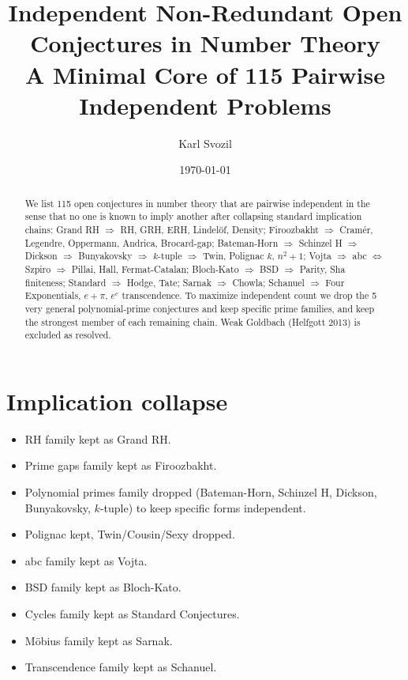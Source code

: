\documentclass[aps,prd,amsmath,amssymb,twocolumn,superscriptaddress]{revtex4-2}
\begin{document}
\title{Independent Non-Redundant Open Conjectures in Number Theory\\
A Minimal Core of 115 Pairwise Independent Problems}
\author{Karl Svozil}
\date{\today}

\begin{abstract}
We list 115 open conjectures in number theory that are pairwise independent in the sense that no one is known to imply another after collapsing standard implication chains: Grand RH $\Rightarrow$ RH, GRH, ERH, Lindel\"of, Density; Firoozbakht $\Rightarrow$ Cram\'er, Legendre, Oppermann, Andrica, Brocard-gap; Bateman-Horn $\Rightarrow$ Schinzel H $\Rightarrow$ Dickson $\Rightarrow$ Bunyakovsky $\Rightarrow$ $k$-tuple $\Rightarrow$ Twin, Polignac $k$, $n^2+1$; Vojta $\Rightarrow$ abc $\Leftrightarrow$ Szpiro $\Rightarrow$ Pillai, Hall, Fermat-Catalan; Bloch-Kato $\Rightarrow$ BSD $\Rightarrow$ Parity, Sha finiteness; Standard $\Rightarrow$ Hodge, Tate; Sarnak $\Rightarrow$ Chowla; Schanuel $\Rightarrow$ Four Exponentials, $e+\pi$, $e^e$ transcendence. To maximize independent count we drop the 5 very general polynomial-prime conjectures and keep specific prime families, and keep the strongest member of each remaining chain. Weak Goldbach (Helfgott 2013) is excluded as resolved.
\end{abstract}

\maketitle

\section{Implication collapse}
\begin{itemize}
\item RH family kept as Grand RH.
\item Prime gaps family kept as Firoozbakht.
\item Polynomial primes family dropped (Bateman-Horn, Schinzel H, Dickson, Bunyakovsky, $k$-tuple) to keep specific forms independent.
\item Polignac kept, Twin/Cousin/Sexy dropped.
\item abc family kept as Vojta.
\item BSD family kept as Bloch-Kato.
\item Cycles family kept as Standard Conjectures.
\item M\"obius family kept as Sarnak.
\item Transcendence family kept as Schanuel.
\end{itemize}
\end{document}
